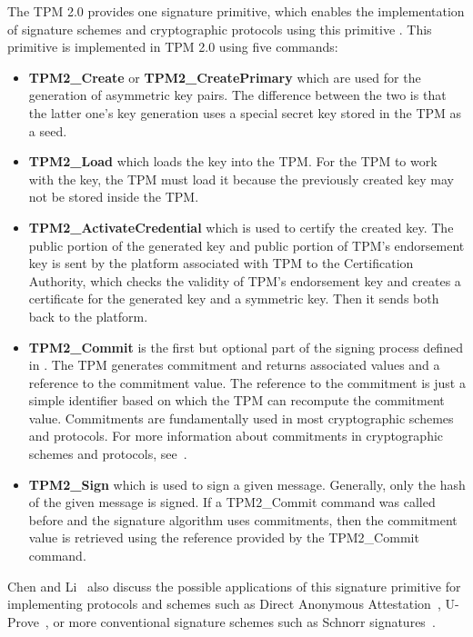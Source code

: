 The TPM 2.0 provides one signature primitive, which enables the implementation of signature schemes and cryptographic protocols using this primitive \cite{chen2013flexible}. This primitive is implemented in TPM 2.0 using five commands:
\begin{itemize}
    \item \textbf{TPM2\_Create} or \textbf{TPM2\_CreatePrimary} which are used for the generation of asymmetric key pairs. The difference between the two is that the latter one's key generation uses a special secret key stored in the TPM as a seed.
    \item \textbf{TPM2\_Load} which loads the key into the TPM. For the TPM to work with the key, the TPM must load it because the previously created key may not be stored inside the TPM.
    \item \textbf{TPM2\_ActivateCredential} which is used to certify the created key. The public portion of the generated key and public portion of TPM's endorsement key is sent by the platform associated with TPM to the Certification Authority, which checks the validity of TPM's endorsement key and creates a certificate for the generated key and a symmetric key. Then it sends both back to the platform.
    \item \textbf{TPM2\_Commit} is the first but optional part of the signing process defined in \cite{chen2013flexible}. The TPM generates commitment and returns associated values and a reference to the commitment value. The reference to the commitment is just a simple identifier based on which the TPM can recompute the commitment value. Commitments are fundamentally used in most cryptographic schemes and protocols. For more information about commitments in cryptographic schemes and protocols, see~\cite{damgaard1998commitment}. 
    \item \textbf{TPM2\_Sign} which is used to sign a given message. Generally, only the hash of the given message is signed. If a TPM2\_Commit command was called before and the signature algorithm uses commitments, then the commitment value is retrieved using the reference provided by the TPM2\_Commit command.
\end{itemize}
Chen and Li~\cite{chen2013flexible} also discuss the possible applications of this signature primitive for implementing protocols and schemes such as Direct Anonymous Attestation~\cite{daaSpec}, U-Prove~\cite{uproveSpec}, or more conventional signature schemes such as Schnorr signatures~\cite{schnorrSpec}. 

